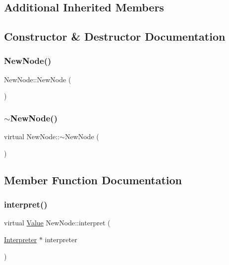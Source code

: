\subsection*{Additional Inherited Members}


\subsection{Constructor \& Destructor Documentation}
\mbox{\label{classNewNode_a55edf2127f3cd875164a199029d7ebba}} 
\subsubsection{\texorpdfstring{New\+Node()}{NewNode()}}
{\footnotesize\ttfamily New\+Node\+::\+New\+Node (\begin{DoxyParamCaption}{ }\end{DoxyParamCaption})}

\mbox{\label{classNewNode_ab06c72bb48fc65bb12a21c1a6c3aa9c8}} 
\subsubsection{\texorpdfstring{$\sim$\+New\+Node()}{~NewNode()}}
{\footnotesize\ttfamily virtual New\+Node\+::$\sim$\+New\+Node (\begin{DoxyParamCaption}{ }\end{DoxyParamCaption})\hspace{0.3cm}{\ttfamily [virtual]}}



\subsection{Member Function Documentation}
\mbox{\label{classNewNode_a77447b9402f0153401bf0e623b5f1e6e}} 
\subsubsection{\texorpdfstring{interpret()}{interpret()}}
{\footnotesize\ttfamily virtual \hyperlink{classValue}{Value} New\+Node\+::interpret (\begin{DoxyParamCaption}\item[{\hyperlink{classInterpreter}{Interpreter} $\ast$}]{interpreter }\end{DoxyParamCaption})\hspace{0.3cm}{\ttfamily [virtual]}}



